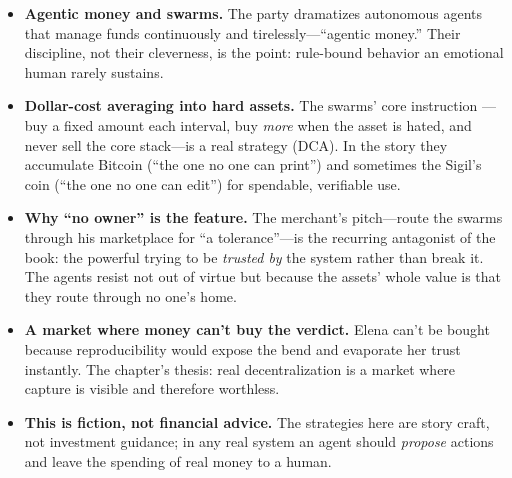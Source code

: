 \begin{itemize}
\tightlist
\item
  \textbf{Agentic money and swarms.} The party dramatizes autonomous agents that
  manage funds continuously and tirelessly---``agentic money.'' Their discipline,
  not their cleverness, is the point: rule-bound behavior an emotional human
  rarely sustains.
\item
  \textbf{Dollar-cost averaging into hard assets.} The swarms' core instruction
  ---buy a fixed amount each interval, buy \emph{more} when the asset is hated,
  and never sell the core stack---is a real strategy (DCA). In the story they
  accumulate Bitcoin (``the one no one can print'') and sometimes the Sigil's coin
  (``the one no one can edit'') for spendable, verifiable use.
\item
  \textbf{Why ``no owner'' is the feature.} The merchant's pitch---route the
  swarms through his marketplace for ``a tolerance''---is the recurring antagonist
  of the book: the powerful trying to be \emph{trusted by} the system rather than
  break it. The agents resist not out of virtue but because the assets' whole
  value is that they route through no one's home.
\item
  \textbf{A market where money can't buy the verdict.} Elena can't be bought
  because reproducibility would expose the bend and evaporate her trust instantly.
  The chapter's thesis: real decentralization is a market where capture is
  visible and therefore worthless.
\item
  \textbf{This is fiction, not financial advice.} The strategies here are story
  craft, not investment guidance; in any real system an agent should
  \emph{propose} actions and leave the spending of real money to a human.
\end{itemize}
